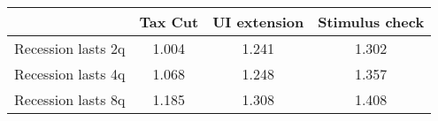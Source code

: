 \begin{tabular}{@{}lccc@{}} 
\toprule 
& Tax Cut    & UI extension    & Stimulus check    \\  \midrule 
Recession lasts 2q &1.004  & 1.241  & 1.302     \\ 
Recession lasts 4q &1.068  & 1.248  & 1.357     \\ 
Recession lasts 8q &1.185  & 1.308  & 1.408     \\ 
\end{tabular}  
